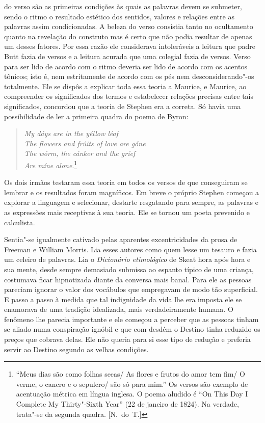 do verso são as primeiras condições às quais as palavras devem se
submeter, sendo o ritmo o resultado estético dos sentidos, valores e
relações entre as palavras assim condicionadas.  A beleza do verso
consistia tanto no ocultamento quanto na revelação do construto mas é
certo que não podia resultar de apenas um desses fatores.  Por essa
razão ele considerava intoleráveis a leitura que padre Butt fazia de
versos e a leitura acurada que uma colegial fazia de versos.  Verso
para ser lido de acordo com o ritmo deveria ser lido de acordo com os
acentos tônicos; isto é, nem estritamente de acordo com os pés nem 
desconsiderando"-os totalmente.  Ele se dispôs a explicar toda essa teoria
a Maurice, e Maurice, ao compreender os significados dos termos e
estabelecer relações precisas entre tais significados, concordou que a
teoria de Stephen era a correta.  Só havia uma possibilidade de ler a
primeira quadra do poema de Byron:

\begin{verse}{\itshape
My dáys are in the yéllow léaf\\				
The flowers and frúits of love are góne\\			
The wórm, the cánker and the gríef\\				
Are míne alone}.\footnote{ ``Meus dias são como folhas secas/ As flores e frutos do amor tem fim/ 
O verme, o cancro e o sepulcro/ são só para mim.'' 
Os versos são exemplo de acentuação métrica em língua inglesa. O poema aludido		
é “On This Day I Complete My Thirty"-Sixth Year”
(22 de janeiro de 1824).  Na verdade, trata"-se da segunda
quadra. [N.~do~T.]}
\end{verse}

Os dois irmãos testaram essa teoria em todos os versos de que
conseguiram se lembrar e os resultados foram magníficos.  Em breve o
próprio Stephen começou a explorar a linguagem e selecionar, destarte
resgatando para sempre, as palavras e as expressões mais receptivas à
sua teoria.  \label{ele"-se} Ele se tornou um poeta prevenido e calculista.

Sentia"-se igualmente cativado pelas aparentes excentricidades da
prosa de Freeman e William Morris.  Lia esses autores como quem lesse
um tesauro e fazia um \label{celeiro} celeiro de palavras.  Lia o \textit{Dicionário
etimológico} de Skeat hora após hora e sua mente, desde sempre
demasiado submissa ao espanto típico de uma criança, costumava ficar
hipnotizada diante da conversa mais banal.  Para ele as pessoas
pareciam ignorar o valor dos vocábulos que empregavam de modo tão
superficial.  E passo a passo à medida que tal indignidade da vida lhe
era imposta ele se enamorava de uma tradição idealizada, mais
verdadeiramente humana.  O fenômeno lhe parecia importante e ele
começou a perceber que as pessoas tinham se aliado numa conspiração 
ignóbil e que com desdém o Destino tinha reduzido os preços que		
cobrava delas.  Ele não queria para si esse tipo de redução e preferia
servir ao Destino segundo as velhas condições.

